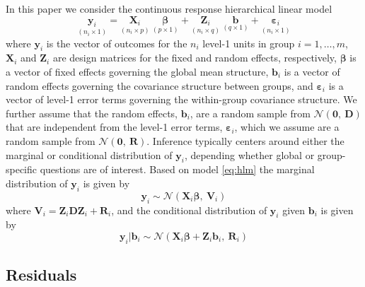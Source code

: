 \documentclass{article} %
\begin{document}
In this paper we consider the continuous response hierarchical linear model
%
\begin{equation}\label{eq:hlm}
	\underset{(n_i \times 1)}{\bm{y}_i} = \underset{(n_i \times p)}{\bm{X}_i} \ \underset{(p \times 1)}{\bm{\beta}} + \underset{(n_i \times q)}{\bm{Z}_i} \ \underset{(q \times 1)}{\bm{b}} + \underset{(n_i \times 1)}{\bm{\varepsilon}_i}
\end{equation}
%
where $\bm{y}_i$ is the vector of outcomes for the $n_i$ level-1 units in group $i=1, \ldots, m$, $\bm{X}_i$ and $\bm{Z}_i$ are design matrices for the fixed and random effects, respectively, $\bm{\beta}$ is a vector of fixed effects governing the global mean structure, $\bm{b}_i$ is a vector of random effects governing the covariance structure between groups, and $\bm{\varepsilon}_i$ is a vector of level-1 error terms governing the within-group covariance structure. We further assume that the random effects, $\bm{b}_i$, are a random sample from $\mathcal{N}(\bm{0},\ \bm{D})$ that are independent from the level-1 error terms, $\bm{\varepsilon}_i$, which we assume are a random sample from $\mathcal{N}(\bm{0},\ \bm{R})$. 
Inference typically centers around either the marginal or conditional distribution of $\bm{y}_i$, depending whether global or group-specific questions are of interest.
Based on model \eqref{eq:hlm} the marginal distribution of $\bm{y}_i$ is given by
%
\begin{equation}\label{eq:marginalmod}
\bm{y}_i \sim \mathcal{N}\left(\bm{X}_i\bm{\beta},\ \bm{V}_i \right)
\end{equation}
%
where $\bm{V}_i = \bm{Z}_i \bm{DZ}_i + \bm{R}_i$, and the conditional distribution of $\bm{y}_i$ given $\bm{b}_i$ is given by
%
\begin{equation}\label{eq:conditionalmod}
\bm{y}_i | \bm{b}_i \sim \mathcal{N}\left(\bm{X}_i\bm{\beta} + \bm{Z}_i \bm{b}_i, \ \bm{R}_i \right)
\end{equation}
%

\subsection{Residuals}
\end{document}
